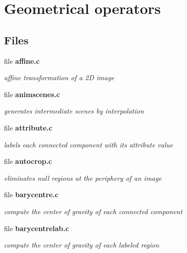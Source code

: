 \section{Geometrical operators}
\label{group__geo}
\subsection*{Files}
\begin{CompactItemize}
\item 
file {\bf affine.c}
\begin{CompactList}\small\item\em affine transformation of a 2D image \item\end{CompactList}

\item 
file {\bf animscenes.c}
\begin{CompactList}\small\item\em generates intermediate scenes by interpolation \item\end{CompactList}

\item 
file {\bf attribute.c}
\begin{CompactList}\small\item\em labels each connected component with its attribute value \item\end{CompactList}

\item 
file {\bf autocrop.c}
\begin{CompactList}\small\item\em eliminates null regions at the periphery of an image \item\end{CompactList}

\item 
file {\bf barycentre.c}
\begin{CompactList}\small\item\em compute the center of gravity of each connected component \item\end{CompactList}

\item 
file {\bf barycentrelab.c}
\begin{CompactList}\small\item\em compute the center of gravity of each labeled region \item\end{CompactList}


\end{CompactItemize}
